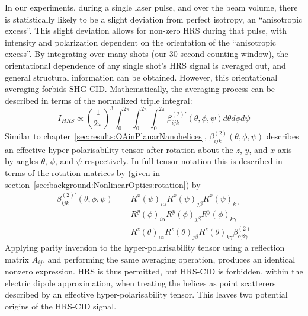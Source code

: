 In our experiments, during a single laser pulse, and over the beam volume, there is statistically likely to be a slight deviation from perfect isotropy, an ``anisotropic excess''. This slight deviation allows for non-zero HRS during that pulse, with intensity and polarization dependent on the orientation of the ``anisotropic excess''. By integrating over many shots (our 30 second counting window), the orientational dependence of any single shot's HRS signal is averaged out, and general structural information can be obtained.
However, this orientational averaging forbids SHG-CID. Mathematically, the averaging process can be described in terms of the normalized triple integral:
\begin{equation}
    I_{HRS} \propto
    \left(\frac{1}{2\pi}\right)^3
    \int_{0}^{2\pi} \int_{0}^{2\pi} \int_{0}^{2\pi}
    \beta_{ijk}^{(2) \prime} (\theta, \phi, \psi)
    d\theta d\phi d\psi
\end{equation}
Similar to chapter~\ref{sec:results:OAinPlanarNanohelices}, $\beta_{ijk}^{(2)} (\theta, \phi, \psi)$ describes an effective hyper-polarisability tensor after rotation about the $z$, $y$, and $x$ axis by angles $\theta$, $\phi$, and $\psi$ respectively. In full tensor notation this is described in terms of the rotation matrices by (given in section~\ref{sec:background:NonlinearOptics:rotation}) by
\begin{equation}
    \begin{split}
        \beta_{ijk}^{(2) \prime} (\theta, \phi, \psi) =
        & R^{x}(\psi)_{i\alpha}R^{x}(\psi)_{j\beta}R^{x}(\psi)_{k\gamma} \\
        & R^{y}(\phi)_{i\alpha}R^{y}(\phi)_{j\beta}R^{y}(\phi)_{k\gamma} \\
        & R^{z}(\theta)_{i\alpha}R^{z}(\theta)_{j\beta}R^{z}(\theta)_{k\gamma}
        \beta_{\alpha \beta \gamma}^{(2)}
    \end{split}
\end{equation}
Applying parity inversion to the hyper-polarisability tensor using a reflection matrix $A_{ij}$, and performing the same averaging operation, produces an identical nonzero expression. HRS is thus permitted, but HRS-CID is forbidden, within the electric dipole approximation, when treating the helices as point scatterers described by an effective hyper-polarisability tensor. 
This leaves two potential origins of the HRS-CID signal.

